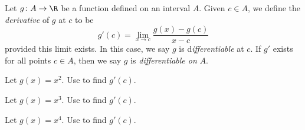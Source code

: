 \begin{definition}
    Let \(g \colon A \to \R\) be a function defined on an interval \(A\). Given \(c \in A\), we define the \textit{derivative} of \(g\) at \(c\) to be 
    \[
    g'(c) = \lim_{x \to c} \frac{g(x) - g(c)}{x - c}
    \]
    provided this limit exists. In this case, we say \(g\) is d\textit{ifferentiable} at \(c\). If \(g'\) exists for all points \(c \in A\), then we say \(g\) is \textit{differentiable on} \(A\).
\end{definition}

\begin{example}
    Let \(g(x) = x^{2}\). Use  to find \(g'(c)\).
\end{example}


\begin{example}
    Let \(g(x) = x^{3}\). Use  to find \(g'(c)\). 
\end{example}


\begin{example}
    Let \(g(x) = x^{4}\). Use  to find \(g'(c)\).
\end{example}


